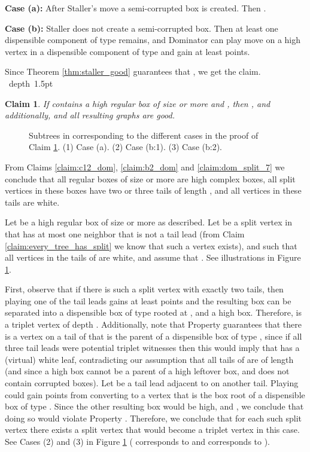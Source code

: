 \documentclass[11pt]{article}
\def\Proof{\par\noindent{\bf Proof:~}}
\def\blackslug{\hbox{\hskip 1pt \vrule width 4pt height 8pt
    depth 1.5pt \hskip 1pt}}
\def\QED{\quad\blackslug\lower 8.5pt\null\par}
\newtheorem{claim}[theorem]{Claim}
\theoremstyle{definition}
\begin{document}
\smallskip
\par\noindent
{\bf Case (a):}
After Staller's move a semi-corrupted box is created.
Then .

\smallskip
\par\noindent
{\bf Case (b):}
Staller does not create a semi-corrupted box.
Then at least one dispensible component of type  remains, 
and Dominator can play move  on a high vertex in a dispensible component of type  and gain at least  points.

\smallskip
\par\noindent
Since Theorem \ref{thm:staller_good} guarantees that , we get the claim.
\QED

\begin{claim}
\label{claim:minus_dom}
If  contains a high regular box of size  or more and , then , and additionally,  and all resulting graphs are good.
\end{claim}
\begin{figure}[thbp]
  \caption{\sf Subtrees in  corresponding to the different cases in the proof of Claim \ref{claim:minus_dom}.
		(1) Case (a). 
		(2) Case (b:1). 
		(3) Case (b:2).} 
  \medskip
  \centering
  \label{fig:dom_6}
\end{figure}
\Proof
From Claims \ref{claim:c12_dom}, \ref{claim:b2_dom} and \ref{claim:dom_split_7} we conclude that all regular boxes of size  or more are high complex boxes, all split vertices in these boxes have two or three tails of length , and all vertices in these tails are white.

Let  be a high regular box of size  or more as described.
Let  be a split vertex in  that has at most one neighbor that is not a tail lead (from Claim \ref{claim:every_tree_has_split} we know that such a vertex exists), and such that all vertices in the tails of  are white, and assume that .
See illustrations in Figure \ref{fig:dom_6}.

First, observe that if there is such a split vertex  with exactly two tails, then playing one of the tail leads gains at least  points and the resulting box can be separated into a dispensible box of type  rooted at , and a high box.
Therefore,  is a triplet vertex of depth .
Additionally, note that Property  guarantees that there is a vertex  on a tail of  that is the parent of a dispensible box of type , since if all three tail leads were potential triplet witnesses then this would imply that  has a (virtual) white leaf, contradicting our assumption that all tails of  are of length  
(and since a high box cannot be a parent of a high leftover box, and  does not contain corrupted boxes). 
Let  be a tail lead adjacent to  on another tail. Playing 
could gain  points from converting  to a  vertex that is the box root of a dispensible box of type .
Since the other resulting box would be high, and , we conclude that doing so would violate Property .
Therefore, we conclude that for each such split vertex  there exists a split vertex  that would become a triplet vertex in this case. 
See Cases (2) and (3) in Figure \ref{fig:dom_6} ( corresponds to  and  corresponds to ).
\end{document}
